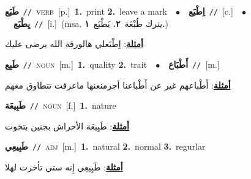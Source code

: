 \documentclass[10pt,a4paper,twoside]{article} %
\begin{document}
\begin{multicols}{2}
{\setlength\topsep{0pt}\textbf{\foreignlanguage{arabic}{طَبَع}}\ {\color{gray}\texttt{//}\color{black}}\ \textsc{verb}\ [p.]\ \textbf{1.}~print  \textbf{2.}~leave a mark\ \ $\bullet$\ \ \setlength\topsep{0pt}\textbf{\foreignlanguage{arabic}{اِطْبَع}}\ {\color{gray}\texttt{//}\color{black}}\ [c.]\ \ $\bullet$\ \ \setlength\topsep{0pt}\textbf{\foreignlanguage{arabic}{يِطْبَع}}\ {\color{gray}\texttt{//}\color{black}}\ [i.]\ \color{gray}(msa. \foreignlanguage{arabic}{يترك طُبْعَة}~\foreignlanguage{arabic}{\textbf{٢.}}  \foreignlanguage{arabic}{يَطْبَع}~\foreignlanguage{arabic}{\textbf{١.}})\color{black}\  \begin{flushright}\color{gray}\foreignlanguage{arabic}{\textbf{\underline{\foreignlanguage{arabic}{أمثلة}}}: اِطْبَعلي هالورقة الله يرضى عليك}\end{flushright}\color{black}} \vspace{2mm}

{\setlength\topsep{0pt}\textbf{\foreignlanguage{arabic}{طَبِع}}\ {\color{gray}\texttt{//}\color{black}}\ \textsc{noun}\ [m.]\ \textbf{1.}~quality  \textbf{2.}~trait\ \ $\bullet$\ \ \setlength\topsep{0pt}\textbf{\foreignlanguage{arabic}{أَطْبَاع}}\ {\color{gray}\texttt{//}\color{black}}\ [m.]\  \begin{flushright}\color{gray}\foreignlanguage{arabic}{\textbf{\underline{\foreignlanguage{arabic}{أمثلة}}}: أَطْباعهم غير عن أَطْباعنا أجرمنعنها ماعرفت تتطاوق معهم}\end{flushright}\color{black}} \vspace{2mm}

{\setlength\topsep{0pt}\textbf{\foreignlanguage{arabic}{طَبِيعَة}}\ {\color{gray}\texttt{//}\color{black}}\ \textsc{noun}\ [f.]\ \textbf{1.}~nature\  \begin{flushright}\color{gray}\foreignlanguage{arabic}{\textbf{\underline{\foreignlanguage{arabic}{أمثلة}}}: طَبِيعَة الأحراش بجنين بتخوت}\end{flushright}\color{black}} \vspace{2mm}

{\setlength\topsep{0pt}\textbf{\foreignlanguage{arabic}{طَبِيعِي}}\ {\color{gray}\texttt{//}\color{black}}\ \textsc{adj}\ [m.]\ \textbf{1.}~natural  \textbf{2.}~normal  \textbf{3.}~regurlar\  \begin{flushright}\color{gray}\foreignlanguage{arabic}{\textbf{\underline{\foreignlanguage{arabic}{أمثلة}}}: طَبِيعِي إِنه ستي تأخرت لهلا}\end{flushright}\color{black}} \vspace{2mm}


\end{multicols}
\end{document}
